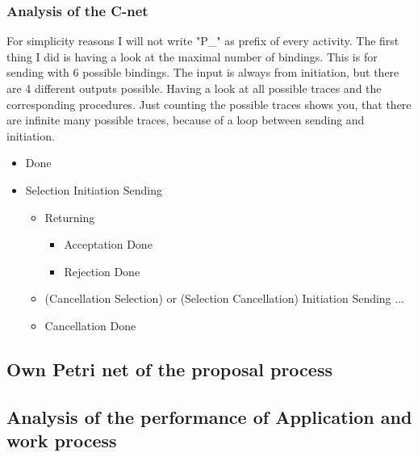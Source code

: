 \subsubsection{Analysis of the C-net}
For simplicity reasons I will not write "P\_" as prefix of every activity.
The first thing I did is having a look at the maximal number of bindings. This is for sending with 6 possible bindings. The input is always from initiation, but there are 4 different outputs possible. Having a look at all possible traces and the corresponding procedures.  Just counting the possible traces shows you, that there are infinite many possible traces, because of a loop between sending and initiation. 
\begin{itemize}
	\item Done
	\item Selection \textrightarrow Initiation \textrightarrow Sending \textrightarrow
	\begin{itemize}
	\item  Returning \textrightarrow
	\begin{itemize}
		\item Acceptation \textrightarrow Done
		\item Rejection \textrightarrow Done
	\end{itemize}
	\item (Cancellation \textrightarrow Selection) or (Selection \textrightarrow Cancellation) \textrightarrow Initiation \textrightarrow Sending ...
	\item Cancellation \textrightarrow Done
	\end{itemize}
\end{itemize}

\subsection{Own Petri net of the proposal process}

\subsection{Analysis of the performance of Application and work process}
